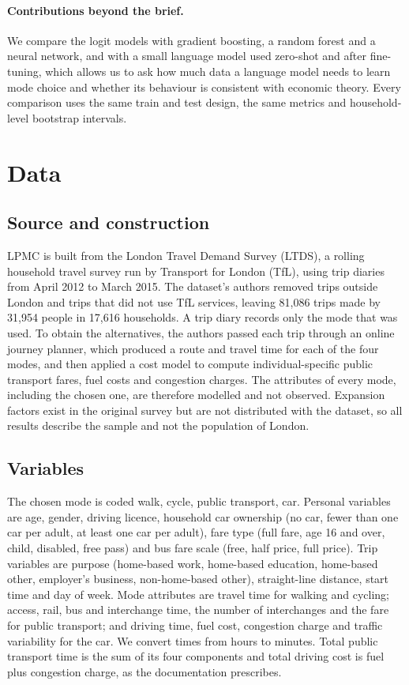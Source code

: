\documentclass[11pt,a4paper]{article}
\begin{document}
\paragraph{Contributions beyond the brief.}
We compare the logit models with gradient boosting, a random forest and a neural network, and with a small language model used zero-shot and after fine-tuning, which allows us to ask how much data a language model needs to learn mode choice and whether its behaviour is consistent with economic theory. Every comparison uses the same train and test design, the same metrics and household-level bootstrap intervals.

\section{Data}
\label{sec:data}

\subsection{Source and construction}
LPMC \citep{hillel2018} is built from the London Travel Demand Survey (LTDS), a rolling household travel survey run by Transport for London (TfL), using trip diaries from April 2012 to March 2015. The dataset's authors removed trips outside London and trips that did not use TfL services, leaving 81,086 trips made by 31,954 people in 17,616 households. A trip diary records only the mode that was used. To obtain the alternatives, the authors passed each trip through an online journey planner, which produced a route and travel time for each of the four modes, and then applied a cost model to compute individual-specific public transport fares, fuel costs and congestion charges. The attributes of every mode, including the chosen one, are therefore modelled and not observed. Expansion factors exist in the original survey but are not distributed with the dataset, so all results describe the sample and not the population of London.

\subsection{Variables}
The chosen mode is coded walk, cycle, public transport, car. Personal variables are age, gender, driving licence, household car ownership (no car, fewer than one car per adult, at least one car per adult), fare type (full fare, age 16 and over, child, disabled, free pass) and bus fare scale (free, half price, full price). Trip variables are purpose (home-based work, home-based education, home-based other, employer's business, non-home-based other), straight-line distance, start time and day of week. Mode attributes are travel time for walking and cycling; access, rail, bus and interchange time, the number of interchanges and the fare for public transport; and driving time, fuel cost, congestion charge and traffic variability for the car. We convert times from hours to minutes. Total public transport time is the sum of its four components and total driving cost is fuel plus congestion charge, as the documentation prescribes.
\end{document}
